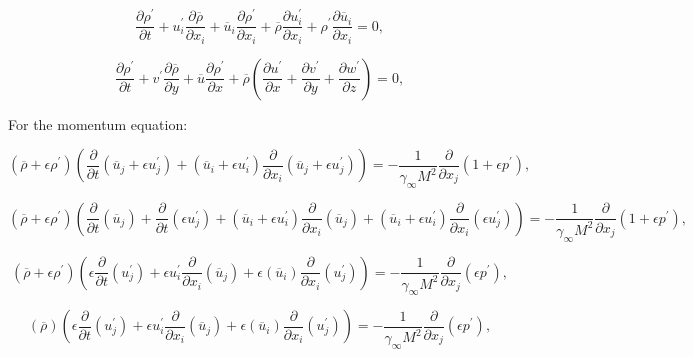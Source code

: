 \begin{equation} 
\frac{\partial\rho^{\prime}}{\partial t}
+
u_i^{\prime}
\frac{\partial \overline{\rho}}{\partial x_i} 
+
\overline{u}_i
\frac{\partial \rho^{\prime}}{\partial x_i} 
+
\overline{\rho}
\frac{\partial u^{\prime}_i}{\partial x_i}
+
\rho^{\prime}
\frac{\partial \overline{u}_i}{\partial x_i}
=
0
,
\end{equation} 

\begin{equation} 
\frac{\partial\rho^{\prime}}{\partial t}
+
v^{\prime}
\frac{\partial \overline{\rho}}{\partial y} 
+
\overline{u}
\frac{\partial \rho^{\prime}}{\partial x} 
+
\overline{\rho}
\left(
\frac{\partial u^\prime}{\partial x}
+
\frac{\partial v^\prime}{\partial y}
+
\frac{\partial w^\prime}{\partial z}
\right)
=
0
,
\end{equation} 

For the momentum equation:


\begin{equation*} 
(\overline{\rho}+\epsilon \rho^{\prime})
\left(
\frac{\partial}{\partial t}
(\overline{u}_j+\epsilon u_j^{\prime})
+
(\overline{u}_i+\epsilon u_i^{\prime})
\frac{\partial}{\partial x_i}
(\overline{u}_j+\epsilon u_j^{\prime})
\right)
=
-
\frac{1}{\gamma_{\infty} M^{2}}
\frac{\partial }{\partial x_j} 
(1+\epsilon p^{\prime})
,
\end{equation*} 

\begin{equation*} 
(\overline{\rho}+\epsilon \rho^{\prime})
\left(
\frac{\partial}{\partial t}
(\overline{u}_j)
+
\frac{\partial}{\partial t}
(\epsilon u_j^{\prime})
+
(\overline{u}_i+\epsilon u_i^{\prime})
\frac{\partial}{\partial x_i}
(\overline{u}_j)
+
(\overline{u}_i+\epsilon u_i^{\prime})
\frac{\partial}{\partial x_i}
(\epsilon u_j^{\prime})
\right)
=
-
\frac{1}{\gamma_{\infty} M^{2}}
\frac{\partial }{\partial x_j} 
(1+\epsilon p^{\prime})
,
\end{equation*} 


\begin{equation*} 
(\overline{\rho}+\epsilon \rho^{\prime})
\left(
\epsilon
\frac{\partial}{\partial t}
( u_j^{\prime})
+
\epsilon u_i^{\prime}
\frac{\partial}{\partial x_i}
(\overline{u}_j)
+
\epsilon 
(\overline{u}_i)
\frac{\partial}{\partial x_i}
(u_j^{\prime})
\right)
=
-
\frac{1}{\gamma_{\infty} M^{2}}
\frac{\partial }{\partial x_j} 
(\epsilon p^{\prime})
,
\end{equation*} 

\begin{equation*} 
(\overline{\rho})
\left(
\epsilon
\frac{\partial}{\partial t}
( u_j^{\prime})
+
\epsilon u_i^{\prime}
\frac{\partial}{\partial x_i}
(\overline{u}_j)
+
\epsilon 
(\overline{u}_i)
\frac{\partial}{\partial x_i}
(u_j^{\prime})
\right)
=
-
\frac{1}{\gamma_{\infty} M^{2}}
\frac{\partial }{\partial x_j} 
(\epsilon p^{\prime})
,
\end{equation*} 

